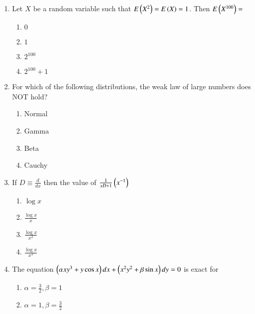 \documentclass[journal]{IEEEtran}
\begin{document}
\begin{enumerate}
{\begin{multicols}{4}
\begin{enumerate}
\item $\frac{11}{12}$
\item $\frac{7}{12}$
\item $\frac{5}{12}$
\item $\frac{3}{4}$
\end{enumerate}
\end{multicols}
}
\item{
Let $X$ be a random variable such that $E\left(X^2\right)=E\left(X\right)=1$. Then $E\left(X^{100}\right)=$
\begin{multicols}{4}
\begin{enumerate}
\item $0$
\item $1$
\item $2^{100}$
\item $2^{100}+1$
\end{enumerate}
\end{multicols}
}
\item{
For which of the following distributions, the weak law of large numbers does NOT hold?
\begin{multicols}{4}
\begin{enumerate}
\item Normal
\item Gamma
\item Beta
\item Cauchy
\end{enumerate}
\end{multicols}
}
\item{
If $D\equiv\frac{d}{dx}$ then the value of $\frac{1}{xD+1}\left(x^{-1}\right)$
\begin{multicols}{4}
\begin{enumerate}
\item $\log{x}$
\item $\frac{\log{x}}{x}$
\item $\frac{\log{x}}{x^2}$
\item $\frac{\log{x}}{x^3}$
\end{enumerate}
\end{multicols}
}
\item{
The equation $\left(\alpha xy^3+y\cos x\right)dx+\left(x^2y^2+\beta\sin x\right)dy=0$ is exact for
\begin{multicols}{4}
\begin{enumerate}
\item $\alpha=\frac{3}{2},\beta=1$
\item $\alpha=1,\beta=\frac{3}{2}$

\end{enumerate}
\end{multicols}}
\end{enumerate}
\end{document}
